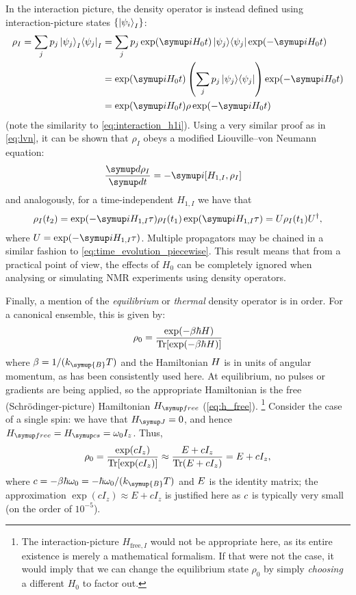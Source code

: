 In the interaction picture, the density operator is instead defined using interaction-picture states $\{\ket{\psi_i}_I\}$:
\begin{align}
    \label{eq:density_matrix_interaction}
    \rho_I = \sum_j p_j \ket{\psi_j}_I \!\bra{\psi_j}_I
           &= \sum_j p_j \exp(\mi H_0 t)\ket{\psi_j}\!\bra{\psi_j} \exp(-\mi H_0 t) \notag \\
           &= \exp(\mi H_0 t) \left(\sum_j p_j \ket{\psi_j}\!\bra{\psi_j}\right) \exp(-\mi H_0 t) \notag \\
           &= \exp(\mi H_0 t) \rho \exp(-\mi H_0 t)
\end{align}
(note the similarity to \cref{eq:interaction_h1i}).
Using a very similar proof as in \cref{eq:lvn}, it can be shown that $\rho_I$ obeys a modified Liouville--von Neumann equation:
\begin{align}
    \label{eq:lvn_interaction}
    \frac{\md\rho_I}{\md t} &= -\mi[H_{1,I}, \rho_I]
\end{align}
and analogously, for a time-independent $H_{1,I}$ we have that
\begin{align}
    \label{eq:lvn_interaction_integrated}
    \rho_I(t_2) = \exp(-\mi H_{1,I}\tau)\rho_I(t_1)\exp(\mi H_{1,I}\tau) = U\rho_I(t_1) U^\dagger,
\end{align}
where $U = \exp(-\mi H_{1,I}\tau)$.
Multiple propagators may be chained in a similar fashion to \cref{eq:time_evolution_piecewise}.
This result means that from a practical point of view, the effects of $H_0$ can be completely ignored when analysing or simulating NMR experiments using density operators.

Finally, a mention of the \textit{equilibrium} or \textit{thermal} density operator is in order.
For a canonical ensemble, this is given by:
\begin{equation}
    \label{eq:thermal_density_operator}
    \rho_0 = \frac{\exp(-\beta\hbar H)}{\operatorname{Tr}[\exp(-\beta\hbar H)]}
\end{equation}
where $\beta = 1/(k_{\symup{B}}T)$ and the Hamiltonian $H\/$ is in units of angular momentum, as has been consistently used here.
At equilibrium, no pulses or gradients are being applied, so the appropriate Hamiltonian is the free (Schr\"odinger-picture) Hamiltonian $\Hfree$ (\cref{eq:h_free}).%
\footnote{The interaction-picture $H_{\text{free},I}$ would not be appropriate here, as its entire existence is merely a mathematical formalism. If that were not the case, it would imply that we can change the equilibrium state $\rho_0$ by simply \textit{choosing} a different $H_0$ to factor out.}
Consider the case of a single spin: we have that $\HJ = 0$, and hence $\Hfree = \Hcs = \omega_0 I_z$. Thus,
\begin{equation}
    \label{eq:nmr_equilibrium_rho}
    \rho_0 = \frac{\exp(cI_z)}{\operatorname{Tr}[\exp(cI_z)]} \approx \frac{E + cI_z}{\operatorname{Tr}(E + cI_z)} = E + cI_z,
\end{equation}
where $c = -\beta\hbar\omega_0 = -\hbar\omega_0/(k_{\symup{B}}T)$ and $E\/$ is the identity matrix; the approximation $\exp(cI_z) \approx E + cI_z$ is justified here as $c\/$ is typically very small (on the order of $10^{-5}$).

